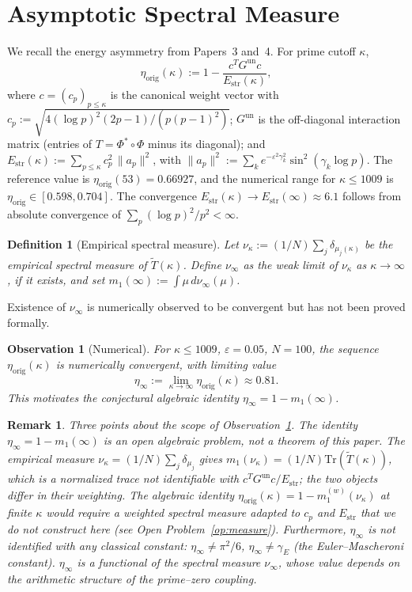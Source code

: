 \documentclass[11pt]{article}
\newtheorem{definition}[theorem]{Definition}
\newtheorem{observation}[theorem]{Observation}
\newtheorem*{remark}{Remark}
\newcommand{\Estr}{E_{\mathrm{str}}}
\newcommand{\etaorig}{\eta_{\mathrm{orig}}}
\newcommand{\Tt}{\widetilde{T}}
\newcommand{\Gun}{G^{\mathrm{un}}}
\begin{document}
\section{Asymptotic Spectral Measure}
\label{sec:asymp}

We recall the energy asymmetry from Papers~3 and~4.
For prime cutoff $\kappa$,
\[
\etaorig(\kappa) := 1 - \frac{c^T \Gun c}{\Estr(\kappa)},
\]
where $c=(c_p)_{p\leq\kappa}$ is the canonical weight vector with
$c_p := \sqrt{4(\log p)^2(2p-1)/(p(p-1)^2)}$;
$\Gun$ is the off-diagonal interaction matrix (entries of $T=\Phi^*\circ\Phi$
minus its diagonal);
and $\Estr(\kappa):=\sum_{p\leq\kappa}c_p^2\,\|a_p\|^2$, with
$\|a_p\|^2:=\sum_k e^{-\varepsilon^2\gamma_k^2}\sin^2(\gamma_k\log p)$.
The reference value is $\etaorig(53)=0.66927$, and the numerical range
for $\kappa\leq 1009$ is $\etaorig\in[0.598,0.704]$.
The convergence $\Estr(\kappa)\to\Estr(\infty)\approx 6.1$ follows from
absolute convergence of $\sum_p(\log p)^2/p^2<\infty$.

\begin{definition}[Empirical spectral measure]
\label{def:meas}
Let $\nu_\kappa := (1/N)\sum_j\delta_{\mu_j(\kappa)}$ be the empirical
spectral measure of $\Tt(\kappa)$.
Define $\nu_\infty$ as the weak limit of $\nu_\kappa$ as $\kappa\to\infty$,
if it exists, and set $m_1(\infty):=\int\mu\,d\nu_\infty(\mu)$.
\end{definition}

Existence of $\nu_\infty$ is numerically observed to be convergent
but has not been proved formally.

\begin{observation}[Numerical]
\label{obs:etainf}
For $\kappa\leq 1009$, $\varepsilon=0.05$, $N=100$, the sequence
$\etaorig(\kappa)$ is numerically convergent, with limiting value
\[
\eta_\infty := \lim_{\kappa\to\infty}\etaorig(\kappa)\approx 0.81.
\]
This motivates the conjectural algebraic identity
$\eta_\infty = 1 - m_1(\infty)$.
\end{observation}

\begin{remark}
Three points about the scope of Observation~\ref{obs:etainf}.
The identity $\eta_\infty = 1 - m_1(\infty)$ is an open algebraic
problem, not a theorem of this paper.
The empirical measure $\nu_\kappa = (1/N)\sum_j\delta_{\mu_j}$ gives
$m_1(\nu_\kappa)=(1/N)\mathrm{Tr}(\Tt(\kappa))$,
which is a normalized trace not identifiable with
$c^T\Gun c/\Estr$; the two objects differ in their weighting.
The algebraic identity $\etaorig(\kappa)=1-m_1^{(w)}(\nu_\kappa)$ at
finite $\kappa$ would require a weighted spectral measure adapted to
$c_p$ and $\Estr$ that we do not construct here
(see Open Problem~\ref{op:measure}).
Furthermore, $\eta_\infty$ is not identified with any classical constant:
$\eta_\infty\neq\pi^2/6$, $\eta_\infty\neq\gamma_E$
(the Euler--Mascheroni constant).
$\eta_\infty$ is a functional of the spectral measure $\nu_\infty$,
whose value depends on the arithmetic structure of the prime--zero coupling.
\end{remark}
\end{document}
